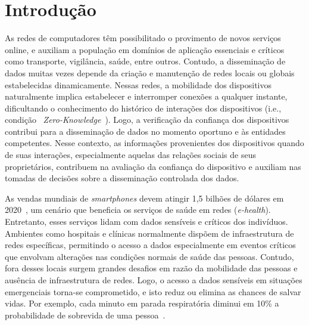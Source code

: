 \documentclass[12pt]{article}
\begin{document}
\section{Introdução}

As redes de computadores têm possibilitado o provimento de novos serviços online, e auxiliam a população em domínios de aplicação essenciais e críticos como transporte, vigilância, saúde, entre outros. Contudo, a disseminação de dados muitas vezes depende da criação e manutenção de redes locais ou globais estabelecidas dinamicamente. Nessas redes, a mobilidade dos dispositivos naturalmente implica estabelecer e interromper conexões a qualquer instante, dificultando o conhecimento do histórico de interações dos  dispositivos (i.e., condição ~\textit{Zero-Knowledge}~\cite{kim2015hcs}). Logo, a verificação da confiança dos dispositivos contribui para a disseminação de dados no momento oportuno e às entidades competentes. 
Nesse contexto, as informações provenientes dos dispositivos quando de suas interações, especialmente aquelas  das relações sociais de seus proprietários, contribuem na avaliação da confiança do dispositivo e auxiliam nas tomadas de decisões sobre a disseminação controlada dos dados.

As vendas mundiais de \textit{smartphones} devem atingir 1,5 bilhões de dólares em 2020~\cite{statista2019}, um cenário que beneficia os serviços de saúde em redes (\textit{e-health}).
Entretanto, esses serviços lidam com dados sensíveis e críticos dos indivíduos. 
Ambientes como hospitais e clínicas normalmente dispõem de infraestrutura de redes específicas, permitindo o acesso a dados especialmente em eventos críticos que envolvam
alterações nas condições normais de saúde das pessoas. Contudo, fora desses locais surgem grandes desafios em razão da mobilidade das pessoas e ausência de infraestrutura de redes.
Logo, o acesso a dados sensíveis em situações emergenciais torna-se comprometido, e isto reduz ou elimina as chances de salvar vidas. Por exemplo, 
cada minuto em parada respiratória diminui em 10\% a probabilidade de sobrevida de uma pessoa~\cite{pazin2003parada}.
\end{document}
